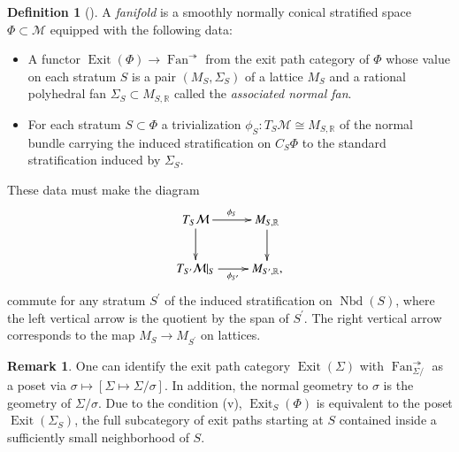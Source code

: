 \documentclass[a4paper,12pt, twoside, pdftex]{amsart}
\theoremstyle{definition}
\newtheorem{definition}[dummy]{Definition}
\newtheorem{remark}[dummy]{Remark}
\numberwithin{equation}{section}
\newcommand{\Exit}{\operatorname{Exit}}
\newcommand{\Fan}{\operatorname{Fan}}
\newcommand{\Nbd}{\operatorname{Nbd}}
\newcommand{\cM}{\mathcal{M}}
\newcommand{\bR}{\mathbb{R}}
\begin{document}
\begin{definition}[{\cite[Definition 2.4]{GS1}}] \label{dfn:fanifold}
A
\emph{fanifold}
is a smoothly normally conical stratified space 
$\Phi \subset \cM$
equipped with the following data:
\begin{itemize}
\item
A functor
$\Exit(\Phi) \to \Fan^\twoheadrightarrow$
from the exit path category of
$\Phi$
whose value on each stratum
$S$
is a pair
$(M_S, \Sigma_S)$
of a lattice
$M_S$
and
a rational polyhedral fan
$\Sigma_S \subset M_{S, \bR}$
called the
\emph{associated normal fan}.
\item
For each stratum
$S \subset \Phi$
a trivialization
$\phi_S \colon T_S \cM \cong M_{S, \bR}$
of the normal bundle carrying the induced stratification on
$C_S \Phi$
to the standard stratification induced by
$\Sigma_S$.
\end{itemize}
These data must make the diagram
\begin{align*}
\begin{gathered}
\xymatrix{
T_S \cM \ar[r]^-{\phi_S} \ar_{}[d] & M_{S, \bR} \ar^{}[d] \\
T_{S^\prime} \cM |_S \ar[r]_-{\phi_{S^\prime}} & M_{S^\prime, \bR},
}
\end{gathered}
\end{align*}
commute for any stratum
$S^\prime$
of the induced stratification on
$\Nbd(S)$,
where the left vertical arrow is the quotient by the span of
$S^\prime$.
The right vertical arrow corresponds to the map
$M_S \to M_{S^\prime}$ 
on lattices.
\end{definition}

\begin{remark}
One can identify the exit path category
$\Exit(\Sigma)$
with
$\Fan^\twoheadrightarrow_{\Sigma /}$
as a poset via
$\sigma \mapsto [\Sigma \mapsto \Sigma / \sigma]$.
In addition,
the normal geometry to
$\sigma$
is the geometry of
$\Sigma / \sigma$.
Due to the condition
(v),
$\Exit_S(\Phi)$
is equivalent to the poset
$\Exit(\Sigma_S)$,
the full subcategory of exit paths starting at
$S$
contained inside a sufficiently small neighborhood of
$S$.
\end{remark}
\end{document}
